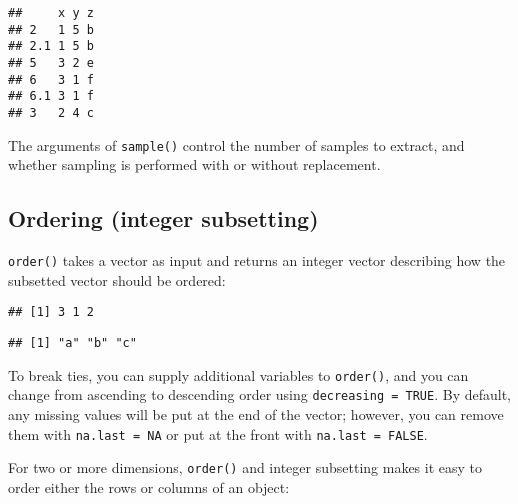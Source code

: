 \begin{verbatim}
##     x y z
## 2   1 5 b
## 2.1 1 5 b
## 5   3 2 e
## 6   3 1 f
## 6.1 3 1 f
## 3   2 4 c
\end{verbatim}

The arguments of \texttt{sample()} control the number of samples to
extract, and whether sampling is performed with or without replacement.

\hypertarget{ordering-integer-subsetting}{%
\subsection{Ordering (integer
subsetting)}\label{ordering-integer-subsetting}}

\texttt{order()} takes a vector as input and returns an integer vector
describing how the subsetted vector should be ordered: 

\begin{Shaded}
\begin{Highlighting}[]
\StringTok{ }\NormalTok{(}\NormalTok{, }\NormalTok{, }\NormalTok{)}
\end{Highlighting}
\end{Shaded}

\begin{verbatim}
## [1] 3 1 2
\end{verbatim}

\begin{Shaded}
\begin{Highlighting}[]
\NormalTok{x[}\NormalTok{(x)]}
\end{Highlighting}
\end{Shaded}

\begin{verbatim}
## [1] "a" "b" "c"
\end{verbatim}

To break ties, you can supply additional variables to \texttt{order()},
and you can change from ascending to descending order using
\texttt{decreasing\ =\ TRUE}. By default, any missing values will be put
at the end of the vector; however, you can remove them with
\texttt{na.last\ =\ NA} or put at the front with
\texttt{na.last\ =\ FALSE}.

For two or more dimensions, \texttt{order()} and integer subsetting
makes it easy to order either the rows or columns of an object:

